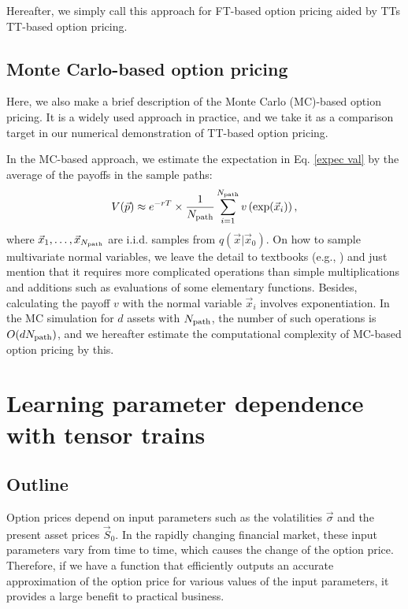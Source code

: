 Hereafter, we simply call this approach for FT-based option pricing aided by TTs TT-based option pricing.

\subsection{Monte Carlo-based option pricing}

Here, we also make a brief description of the Monte Carlo (MC)-based option pricing.
It is a widely used approach in practice, and we take it as a comparison target in our numerical demonstration of TT-based option pricing.

In the MC-based approach, we estimate the expectation in Eq. \eqref{expec val} by the average of the payoffs in the sample paths:
\begin{equation}
    V(\vec{p})\approx e^{-rT} \times \frac{1}{N_{\rm path}} \sum_{i=1}^{N_{\rm path}} v\left(\exp(\vec{x}_i)\right),
\end{equation}
where $\vec{x}_1,\ldots,\vec{x}_{N_{\rm path}}$ are i.i.d. samples from $q(\vec{x}|\vec{x}_0)$.
On how to sample multivariate normal variables, we leave the detail to textbooks (e.g., \cite{glasserman2004monte}) and just mention that it requires more complicated operations than simple multiplications and additions such as evaluations of some elementary functions.
Besides, calculating the payoff $v$ with the normal variable $\vec{x}_i$ involves exponentiation.
In the MC simulation for $d$ assets with $N_{\rm path}$, the number of such operations is $O(d N_{\rm path})$, and we hereafter estimate the computational complexity of MC-based option pricing by this.


\section{Learning parameter dependence with tensor trains}


\subsection{Outline}
Option prices depend on input parameters such as the volatilities $\vec{\sigma}$ and the present asset prices $\vec{S}_0$. 
In the rapidly changing financial market, these input parameters vary from time to time, which causes the change of the option price.
Therefore, if we have a function that efficiently outputs an accurate approximation of the option price for various values of the input parameters, it provides a large benefit to practical business.

